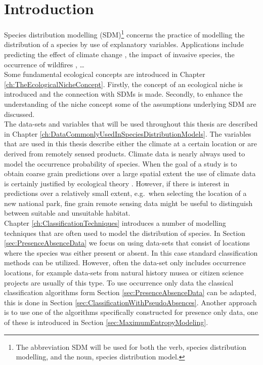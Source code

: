 \chapter{Introduction}
\label{ch:Introduction}
Species distribution modelling (SDM)\footnote{The abbreviation SDM will be used for both the verb, species distribution modelling, and the noun, species distribution model.} concerns the practice of modelling the distribution of a species by use of explanatory variables. Applications include predicting the effect of climate change \parencite[e.g.][]{pearson_predicting_2003, pearson_modelling_2004}, the impact of invasive species, the occurrence of wildfires \parencite{parisien_environmental_2009}, \ldots \\

Some fundamental ecological concepts are introduced in Chapter \ref{ch:TheEcologicalNicheConcept}. Firstly, the concept of an ecological niche is introduced and the connection with SDMs is made. Secondly, to enhance the understanding of the niche concept some of the assumptions underlying SDM are discussed. \\

The data-sets and variables that will be used throughout this thesis are described in Chapter \ref{ch:DataCommonlyUsedInSpeciesDistributionModels}. The variables that are used in this thesis describe either the climate at a certain location or are derived from remotely sensed products. Climate data is nearly always used to model the occurrence probability of species. When the goal of a study is to obtain coarse grain predictions over a large spatial extent the use of climate data is certainly justified by ecological theory \parencite{pearson_predicting_2003}. However, if there is interest in predictions over a relatively small extent, e.g.\ when selecting the location of a new national park, fine grain remote sensing data might be useful to distinguish between suitable and unsuitable habitat. \\

Chapter \ref{ch:ClassificationTechniques} introduces a number of modelling techniques that are often used to model the distribution of species. In Section \ref{sec:PresenceAbsenceData} we focus on using data-sets that consist of locations where the species was either present or absent. In this case standard classification methods can be utilized. However, often the data-set only includes occurrence locations, for example data-sets from natural history musea or citizen science projects are usually of this type. To use occurrence only data the classical classification algorithms form Section \ref{sec:PresenceAbsenceData} can be adapted, this is done in Section \ref{sec:ClassificationWithPseudoAbsences}. Another approach is to use one of the algorithms specifically constructed for presence only data, one of these is introduced in Section \ref{sec:MaximumEntropyModeling}. \\ 
 

